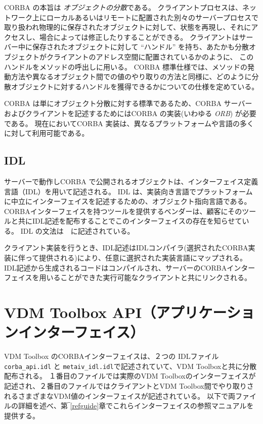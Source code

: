 \documentclass[\pformat,12pt]{jarticle}
\begin{document}
CORBA の本旨は {\em オブジェクトの分散}である。
クライアントプロセスは、ネットワーク上にローカルあるいはリモートに配置された別々のサーバープロセスで取り扱われ物理的に保存されたオブジェクトに対して、状態を再現し、それにアクセスし、場合によっては修正したりすることができる。
クライアントはサーバー中に保存されたオブジェクトに対して ``ハンドル'' を持ち、あたかも分散オブジェクトがクライアントのアドレス空間に配置されているかのように、 このハンドルをメソッドの呼出しに用いる。
 CORBA 標準仕様では、メソッドの発動方法や異なるオブジェクト間での値のやり取りの方法と同様に、どのように分散オブジェクトに対するハンドルを獲得できるかについての仕様を定めている。

 CORBA は単にオブジェクト分散に対する標準であるため、CORBA サーバーおよびクライアントを記述するためにはCORBA の実装(いわゆる {\em ORB}) が必要である。
現在においてCORBA 実装は、異なるプラットフォームや言語の多くに対して利用可能である。  

\subsection{IDL}

サーバーで動作しCORBA で公開されるオブジェクトは、インターフェイス定義言語（IDL）を用いて記述される。
IDL は、実装向き言語でプラットフォームに中立にインターフェイスを記述するための、オブジェクト指向言語である。
CORBAインターフェイスを持つツールを提供するベンダーは、顧客にそのツールと共にIDL記述を配布することでこのインターフェイスの存在を知らせている。
IDL の文法は　\cite{OMG&96}に記述されている。 

クライアント実装を行うとき、IDL記述はIDLコンパイラ(選択されたCORBA実装に伴って提供される)により、任意に選択された実装言語にマップされる。
 IDL記述から生成されるコードはコンパイルされ、サーバーのCORBAインターフェイスを用いることができた実行可能なクライアントと共にリンクされる。

\newpage
\section{VDM Toolbox API（アプリケーションインターフェイス）} 
\label{Toolboxapi}

VDM Toolbox のCORBAインターフェイスは、２つの IDLファイル {\tt corba\_api.idl} と {\tt metaiv\_idl.idl}で記述されていて、VDM Toolboxと共に分散配布される。
１番目のファイルでは実際のVDM Toolboxのインターフェイスが記述され、２番目のファイルではクライアントとVDM Toolbox間でやり取りされるさまざまなVDM値のインターフェイスが記述されている。
以下で両ファイルの詳細を述べ、第‾\ref{refguide}章でこれらインターフェイスの参照マニュアルを提供する。
\end{document}
